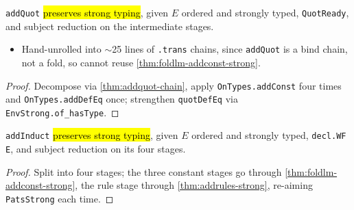 \begin{lemma}
\label{thm:addquot-strong}
\leanok
{}

 \texttt{addQuot} \hl{preserves strong typing}, given $E$ ordered and
strongly typed, \texttt{QuotReady}, and subject reduction on the intermediate stages.
\begin{itemize}
\item {} Hand-unrolled into $\sim$25 lines of \texttt{.trans} chains, since
  \texttt{addQuot} is a bind chain, not a fold, so cannot reuse
  \ref{thm:foldlm-addconst-strong}.
\end{itemize}
\end{lemma}
\begin{proof}
\leanok
{} Decompose via \ref{thm:addquot-chain}, apply \texttt{OnTypes.addConst} four
times and \texttt{OnTypes.addDefEq} once; strengthen \texttt{quotDefEq} via
\texttt{EnvStrong.of\_hasType}.
\end{proof}

\begin{theorem}
\label{thm:addinduct-strong}
\leanok
{}

 \texttt{addInduct} \hl{preserves strong typing}, given $E$ ordered and
strongly typed, \texttt{decl.WF E}, and subject reduction on its four stages.
\end{theorem}
\begin{proof}
\leanok
{} Split into four stages; the three constant stages go through
\ref{thm:foldlm-addconst-strong}, the rule stage through \ref{thm:addrules-strong},
re-aiming \texttt{PatsStrong} each time.
\end{proof}

